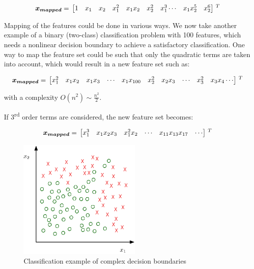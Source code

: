 \begin{equation}{\label{eqn:featureMapping2}}
\bm{x_{mapped}}
=\,
\begin{bmatrix}
1 & x_1 & x_2 & x_1^2 & x_1x_2 & x_2^2 & x_1^3 \cdots & x_1x_2^5 & x_2^6 
\end{bmatrix}
\,^ T
\end{equation} 

Mapping of the features could be done in various ways. 
We now take another example of a binary (two-class) classification problem with 100 features, which needs a nonlinear decision boundary to achieve a satisfactory classification.
One way to map the feature set could be such that only the quadratic terms are taken into account, which would result in a new feature set such as:
 
\begin{equation}{\label{eqn:featureMapping3}}
\bm{x_{mapped}}
=\,
\begin{bmatrix}
x_1^2 & x_1x_2 & x_1x_3 & \cdots & x_1x_{100} & x_2^2 & x_2x_3 & \cdots & x_3^2 & x_3x_4  \cdots  
\end{bmatrix}
\,^ T
\end{equation} 

with a complexity $O(n^2) \sim \frac{n^2}{2}$.

If 3\textsuperscript{rd} order terms are considered, the new feature set becomes:

\begin{equation}{\label{eqn:featureMapping4}}
\bm{x_{mapped}}
=\,
\begin{bmatrix}
x_1^3 & x_1x_2x_3 & x_1^2x_2 & \cdots  & x_{11}x_{13}x_{17} & \cdots  
\end{bmatrix}
\,^ T
\end{equation} 

\begin{figure}
\begin{center}
\includegraphics[width=6cm]{figures/complexDecisionBoundary}    %
\caption{Classification example of complex decision boundaries} 
\label{fig:complexBoundary}
\end{center}
\end{figure}

